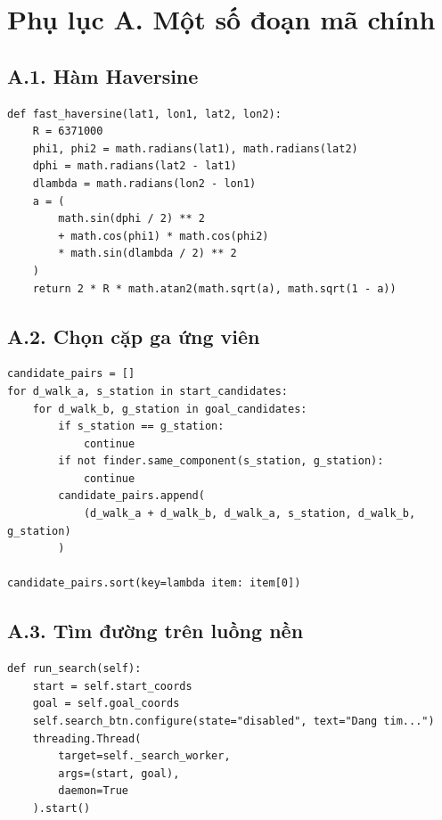 \documentclass[12pt,a4paper]{article}
\begin{document}
\newpage
\appendix
\section*{Phụ lục A. Một số đoạn mã chính}

\subsection*{A.1. Hàm Haversine}

\begin{lstlisting}[style=pythonstyle, caption={Tính khoảng cách Haversine}]
def fast_haversine(lat1, lon1, lat2, lon2):
    R = 6371000
    phi1, phi2 = math.radians(lat1), math.radians(lat2)
    dphi = math.radians(lat2 - lat1)
    dlambda = math.radians(lon2 - lon1)
    a = (
        math.sin(dphi / 2) ** 2
        + math.cos(phi1) * math.cos(phi2)
        * math.sin(dlambda / 2) ** 2
    )
    return 2 * R * math.atan2(math.sqrt(a), math.sqrt(1 - a))
\end{lstlisting}

\subsection*{A.2. Chọn cặp ga ứng viên}

\begin{lstlisting}[style=pythonstyle, caption={Ý tưởng chọn cặp ga ứng viên}]
candidate_pairs = []
for d_walk_a, s_station in start_candidates:
    for d_walk_b, g_station in goal_candidates:
        if s_station == g_station:
            continue
        if not finder.same_component(s_station, g_station):
            continue
        candidate_pairs.append(
            (d_walk_a + d_walk_b, d_walk_a, s_station, d_walk_b, g_station)
        )

candidate_pairs.sort(key=lambda item: item[0])
\end{lstlisting}

\subsection*{A.3. Tìm đường trên luồng nền}

\begin{lstlisting}[style=pythonstyle, caption={Chạy tìm đường trong background thread}]
def run_search(self):
    start = self.start_coords
    goal = self.goal_coords
    self.search_btn.configure(state="disabled", text="Dang tim...")
    threading.Thread(
        target=self._search_worker,
        args=(start, goal),
        daemon=True
    ).start()
\end{lstlisting}
\end{document}
